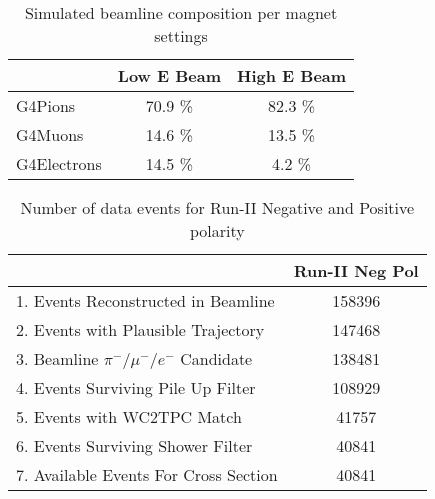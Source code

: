 \documentclass[letterpaper,12pt]{yalephd}
\begin{document}
\begin{table}[]
\centering
\begin{tabular}{|l|c|c|}
\hline
                     & Low E Beam          & High E Beam\\ \hline
G4Pions       &   70.9 \%          &       82.3 \%         \\ \hline
G4Muons     &   14.6 \%           &      13.5 \%         \\ \hline
G4Electrons &   14.5 \%           &       4.2 \%         \\ \hline
\end{tabular}
\caption{Simulated beamline composition per magnet settings}
\label{tab:beamline}
\end{table}



\begin{table}[b]
\centering
\begin{tabular}{|l|c|}
\hline
                                                        & Run-II Neg Pol     \\ \hline
1. Events Reconstructed in Beamline        &  158396    \\ \hline
2. Events with Plausible Trajectory            &   147468   \\ \hline
3. Beamline $\pi^-/\mu^-/e^-$  Candidate  &   138481    \\ \hline
4. Events Surviving Pile Up Filter              &   108929        \\ \hline
5. Events with WC2TPC Match                 &    41757   \\ \hline
6. Events Surviving Shower Filter             &    40841       \\ \hline
7. Available Events For Cross Section      &   40841       \\ \hline
\end{tabular}
\caption{Number of data events for Run-II Negative and Positive polarity }
\label{tab:beamlineDataSelection}
\end{table}
\end{document}
